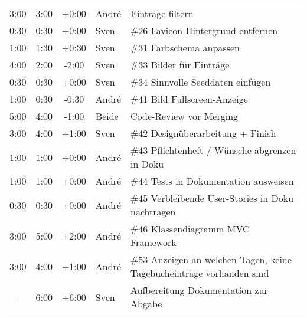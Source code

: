 \begin{longtable}{ c c c l l }
  3:00 & 3:00 & +0:00 & André & Eintrage filtern \\
  0:30 & 0:30 & +0:00 & Sven & \#26 Favicon Hintergrund entfernen \\
  1:00 & 1:30 & +0:30 & Sven & \#31 Farbschema anpassen \\
  4:00 & 2:00 & -2:00 & Sven & \#33 Bilder für Einträge \\
  0:30 & 0:30 & +0:00 & Sven & \#34 Sinnvolle Seeddaten einfügen \\
  1:00 & 0:30 & -0:30 & André & \#41 Bild Fullscreen-Anzeige \\
  5:00 & 4:00 & -1:00 & Beide & Code-Review vor Merging \\
  3:00 & 4:00 & +1:00 & Sven & \#42 Designüberarbeitung + Finish \\
  1:00 & 1:00 & +0:00 & André & \#43 Pflichtenheft / Wünsche abgrenzen in Doku \\
  1:00 & 1:00 & +0:00 & André & \#44 Tests in Dokumentation ausweisen \\
  0:30 & 0:30 & +0:00 & André & \#45 Verbleibende User-Stories in Doku nachtragen \\
  3:00 & 5:00 & +2:00 & André & \#46 Klassendiagramm MVC Framework \\
  3:00 & 4:00 & +1:00 & André & \#53 Anzeigen an welchen Tagen, keine Tagebucheinträge vorhanden sind \\
  - & 6:00 & +6:00 & Sven & Aufbereitung Dokumentation zur Abgabe \\

\end{longtable}

